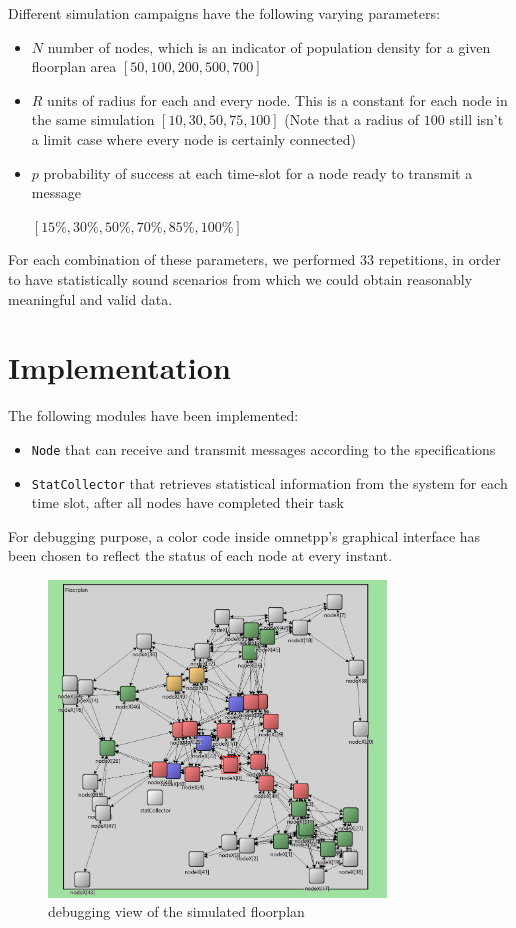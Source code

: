 Different simulation campaigns have the following varying parameters:
\begin{itemize}
\item $N$ number of nodes, which is an indicator of population density for a given floorplan area $[50, 100, 200, 500, 700]$
\item $R$ units of radius for each and every node. This is a constant for each node in the same simulation $[10, 30, 50, 75, 100]$ (Note that a radius of $100$ still isn't a limit case where every node is certainly connected)
\item $p$ probability of success at each time-slot for a node ready to transmit a message 

$[15\%, 30\%, 50\%, 70\%, 85\%, 100\%]$
\end{itemize}
For each combination of these parameters, we performed $33$ repetitions, in order to have statistically sound scenarios from which we could obtain reasonably meaningful and valid data.
\section{Implementation}
The following modules have been implemented:
\begin{itemize}
\item \texttt{Node} that can receive and transmit messages according to the specifications
\item \texttt{StatCollector} that retrieves statistical information from the system for each time slot, after all nodes have completed their task
\end{itemize}
For debugging purpose, a color code inside omnetpp's graphical interface has been chosen to reflect the status of each node at every instant.

\begin{figure}
\centering
\includegraphics[width=0.8\textwidth]{./images/floorplan3.png}
\caption{debugging view of the simulated floorplan}
\end{figure}

